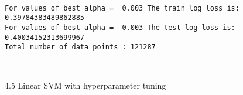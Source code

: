 \documentclass[11pt]{article}
\begin{document}
    \begin{center}
    \end{center}
    { \hspace*{\fill} \\}
    
    \begin{Verbatim}[commandchars=\\\{\}]
For values of best alpha =  0.003 The train log loss is: 0.39784383489862885
For values of best alpha =  0.003 The test log loss is: 0.40034152313699967
Total number of data points : 121287

    \end{Verbatim}

    \begin{center}
    \end{center}
    { \hspace*{\fill} \\}
    
    4.5 Linear SVM with hyperparameter tuning
\end{document}
